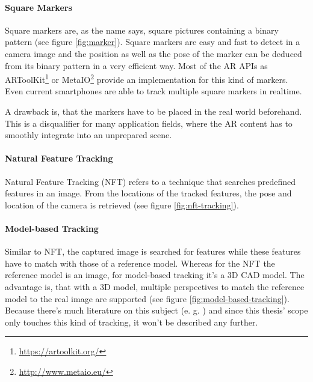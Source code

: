 \paragraph{Square Markers}
Square markers are, as the name says, square pictures containing a binary pattern (see figure \ref{fig:marker}). Square markers are easy and fast to detect in a camera image and the position as well as the pose of the marker can be deduced from its binary pattern in a very efficient way. Most of the AR APIs as ARToolKit\footnote{\url{https://artoolkit.org/}} or MetaIO\footnote{\url{http://www.metaio.eu/}} provide an implementation for this kind of markers. Even current smartphones are able to track multiple square markers in realtime.

A drawback is, that the markers have to be placed in the real world beforehand. This is a disqualifier for many application fields, where the AR content has to smoothly integrate into an unprepared scene.

\paragraph{Natural Feature Tracking}
Natural Feature Tracking (NFT) refers to a technique that searches predefined features in an image. From the locations of the tracked features, the pose and location of the camera is retrieved \citep{neumann1999natural} (see figure \ref{fig:nft-tracking}).

\paragraph{Model-based Tracking}
Similar to NFT, the captured image is searched for features while these features have to match with those of a reference model. Whereas for the NFT the reference model is an image, for model-based tracking it's a 3D CAD model. The advantage is, that with a 3D model, multiple perspectives to match the reference model to the real image are supported (see figure \ref{fig:model-based-tracking}).
Because there's much literature on this subject (e. g. \citep{lepetit2005monocular}) and since this thesis' scope only touches this kind of tracking, it won't be described any further.

